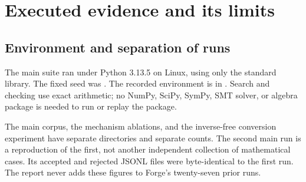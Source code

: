 \section{Executed evidence and its limits}
\label{sec:evidence}
\subsection{Environment and separation of runs}
The main suite ran under Python 3.13.5 on Linux, using only the standard library. The fixed seed was . The recorded environment is in . Search and checking use exact  arithmetic; no NumPy, SciPy, SymPy, SMT solver, or algebra package is needed to run or replay the package.

The main corpus, the mechanism ablations, and the inverse-free conversion experiment have separate directories and separate counts. The second main run is a reproduction of the first, not another independent collection of mathematical cases. Its accepted and rejected JSONL files were byte-identical to the first run. The report never adds these figures to Forge's twenty-seven prior runs.

